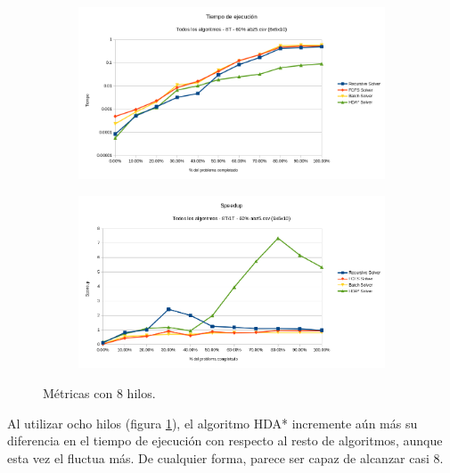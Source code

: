 \begin{figure}[h]
    \begin{subfigure}{.5\textwidth}
        \begin{center}
            \includegraphics[width=\textwidth]{Media/Ch2/Runtime_All_Algorithms_8.png}
        \end{center}
    \end{subfigure}
    \begin{subfigure}{.5\textwidth}
        \begin{center}
            \includegraphics[width=\textwidth]{Media/Ch2/Speedup_All_Algorithms_8.png}
        \end{center}
    \end{subfigure}
    \caption{Métricas con 8 hilos.}
    \label{fig:Metricas8Thread}
\end{figure}

Al utilizar ocho hilos (figura \ref{fig:Metricas8Thread}), el algoritmo HDA* incremente aún más su diferencia
en el tiempo de ejecución con respecto al resto de algoritmos,
aunque esta vez el  fluctua más.
De cualquier forma, parece ser capaz de alcanzar casi 8.

